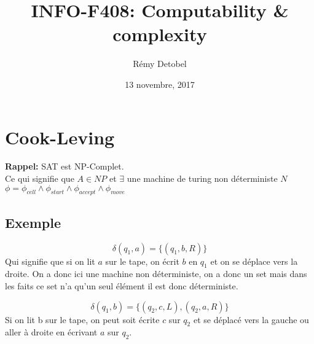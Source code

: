 \documentclass[a4paper,12pt]{article}
\title{INFO-F408: Computability \& complexity}
\date{13 novembre, 2017}
\author{Rémy Detobel}
\begin{document}
\maketitle
\newpage

\section{Cook-Leving}
  \textbf{Rappel:} SAT est NP-Complet.\\
  Ce qui signifie que $A \in NP$ et $\exists$ une machine de turing non déterministe $N$\\
  $\phi = \phi_{cell} \wedge \phi_{start} \wedge \phi_{accept} \wedge \phi_{move}$
  
  \subsection{Exemple}
    $$\delta(q_1, a) = \{(q_1, b, R)\}$$
    Qui signifie que si on lit $a$ sur le tape, on écrit $b$ en $q_1$ et on se déplace vers la droite.  On a donc ici une machine non déterministe, on a donc un set mais dans les faits ce set n'a qu'un seul élément il est donc déterministe.
    
    $$\delta(q_1, b) = \{(q_2, c, L), (q_2, a, R)\}$$
    Si on lit b sur le tape, on peut soit écrite $c$ sur $q_2$ et se déplacé vers la gauche ou aller à droite en écrivant $a$ sur $q_2$.
  
\end{document}
